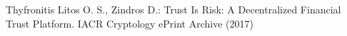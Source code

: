 \begin{thebibliography}{40}
  Thyfronitis Litos O. S., Zindros D.: Trust Is Risk: A Decentralized Financial Trust Platform. IACR Cryptology ePrint
  Archive (2017)

\end{thebibliography}
